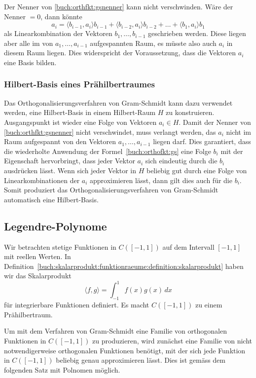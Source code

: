 Der Nenner von \eqref{buch:orthfkt:gsnenner} kann nicht verschwinden.
Wäre der Nenner $=0$, dann könnte
\[
a_i
=
\langle b_{i-1},a_i\rangle b_{i-1} + \langle b_{i-2},a_i\rangle b_{i-2}
+ \dots + \langle b_1,a_i\rangle b_1
\]
als Linearkombination der Vektoren $b_1,\dots,b_{i-1}$ geschrieben
werden.
Diese liegen aber alle im von $a_1,\dots,a_{i-1}$ aufgespannten Raum,
es müsste also auch $a_i$ in diesem Raum liegen.
Dies widerspricht der Voraussetzung, dass die Vektoren $a_i$ eine Basis
bilden.

%
%
\subsubsection{Hilbert-Basis eines Prähilbertraumes}
Das Orthogonalisierungsverfahren von Gram-Schmidt kann dazu verwendet
werden, eine Hilbert-Basis in einem Hilbert-Raum $H$ zu konstruieren.
Ausgangspunkt ist wieder eine Folge von Vektoren $a_i\in H$.
Damit der Nenner von \eqref{buch:orthfkt:gsnenner} nicht verschwindet,
muss verlangt werden, das $a_i$ nicht im Raum aufgespannt von den
Vektoren $a_1,\dots,a_{i-1}$ liegen darf.
Dies garantiert, dass die wiederholte Anwendung der
Formel~\eqref{buch:orthofkt:gs} eine Folge $b_i$ mit der Eigenschaft
hervorbringt, dass jeder Vektor $a_i$ sich eindeutig durch die
$b_i$ ausdrücken lässt.
Wenn sich jeder Vektor in $H$ beliebig gut durch eine Folge von
Linearkombinationen der $a_i$ approximieren lässt, dann gilt dies auch
für die $b_i$.
Somit produziert das Orthogonalisierungsverfahren von Gram-Schmidt
automatisch eine Hilbert-Basis.

%
%
\subsection{Legendre-Polynome}
Wir betrachten stetige Funktionen in $C([-1,1])$ auf dem Intervall
$[-1,1]$ mit reellen Werten.
In Definition~\ref{buch:skalarprodukt:funktionraeume:definition:skalarprodukt}
haben wir das Skalarprodukt
\[
\langle f,g\rangle
=
\int_{-1}^1 f(x)g(x)\,dx
\]
für integrierbare Funktionen definiert.
Es macht $C([-1,1])$ zu einem Prähilbertraum.

Um mit dem Verfahren von Gram-Schmidt eine Familie von orthogonalen
Funktionen in $C([-1,1])$ zu produzieren, wird zunächst eine Familie
von nicht notwendigerweise orthogonalen Funktionen benötigt, mit der
sich jede Funktion in $C([-1,1])$ beliebig genau approximieren
lässt.
Dies ist gemäss dem folgenden Satz mit Polnomen möglich.

